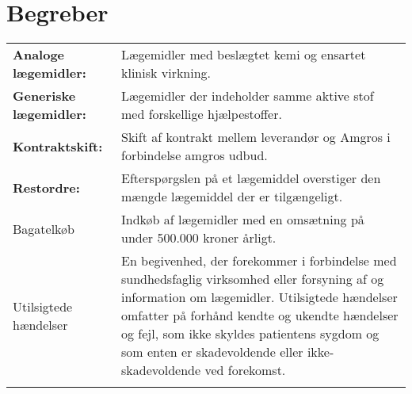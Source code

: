 \section*{Begreber}
\begin{table}[H]
\begin{tabular}{p{4.5cm} p{10.5cm}}
\textbf{Analoge lægemidler:} & Lægemidler med beslægtet kemi og ensartet klinisk virkning. \vspace{0.5cm} \\
\textbf{Generiske lægemidler:} & Lægemidler der indeholder samme aktive stof med forskellige hjælpestoffer.\vspace{0.5cm} \\
\textbf{Kontraktskift:} & Skift af kontrakt mellem leverandør og Amgros i forbindelse amgros udbud.  \vspace{0.5cm} \\
\textbf{Restordre:} & Efterspørgslen på et lægemiddel overstiger den mængde lægemiddel der er tilgængeligt.  \vspace{0.5cm} \\
Bagatelkøb & Indkøb af lægemidler med en omsætning på under 500.000 kroner årligt. \vspace{0.5cm} \\
Utilsigtede hændelser & En begivenhed, der forekommer i forbindelse med sundhedsfaglig virksomhed eller forsyning af og information om lægemidler. Utilsigtede hændelser omfatter på forhånd kendte og ukendte hændelser og fejl, som ikke skyldes patientens sygdom og som enten er skadevoldende eller ikke-skadevoldende ved forekomst. \vspace{0.5cm} \\
& \vspace{0.5cm} \\
\end{tabular}
\end{table}




